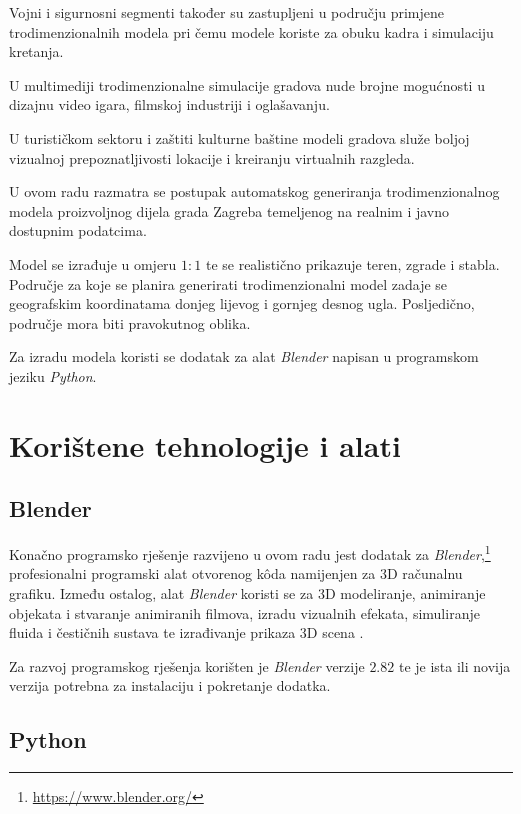 \documentclass[times, utf8, zavrsni, numeric]{fer}
\begin{document}
	Vojni i sigurnosni segmenti također su zastupljeni u području primjene trodimenzionalnih modela pri čemu modele koriste za obuku kadra i simulaciju kretanja.
	
	U multimediji trodimenzionalne simulacije gradova nude brojne mogućnosti u dizajnu video igara, filmskoj industriji i oglašavanju.  
	
	U turističkom sektoru i zaštiti kulturne baštine modeli gradova služe boljoj vizualnoj prepoznatljivosti lokacije i kreiranju virtualnih razgleda.
	
	\eject
	
	U ovom radu razmatra se postupak automatskog generiranja trodimenzionalnog modela proizvoljnog dijela grada Zagreba  temeljenog na realnim i javno dostupnim podatcima.
	
	Model se izrađuje u omjeru $1:1$ te se realistično prikazuje teren, zgrade i stabla.
	Područje za koje se planira generirati trodimenzionalni model zadaje se geografskim koordinatama donjeg lijevog i gornjeg desnog ugla. 
	Posljedično, područje mora biti pravokutnog oblika.
	
	Za izradu modela koristi se dodatak za alat \textit{Blender} napisan u programskom jeziku \textit{Python}.



\chapter{Korištene tehnologije i alati}

	\section{Blender}

		Konačno programsko rješenje razvijeno u ovom radu jest dodatak  za \textit{Blender},\footnote{\url{https://www.blender.org/}} profesionalni programski alat otvorenog kôda namijenjen za 3D računalnu grafiku.
		Između ostalog, alat \textit{Blender} koristi se za 3D modeliranje, animiranje objekata i stvaranje animiranih filmova, izradu vizualnih efekata, simuliranje fluida i čestičnih sustava te izrađivanje prikaza 3D scena .
		
		Za razvoj programskog rješenja korišten je \textit{Blender} verzije $2.82$ te je ista ili novija verzija potrebna za instalaciju i pokretanje dodatka.
	
	
	
	\section{Python}
\end{document}
